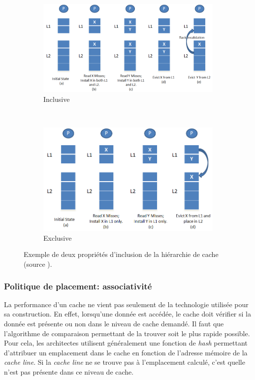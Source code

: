 \begin{figure}
    \centering
    \begin{subfigure}[b]{0.45\linewidth}
        \includegraphics[width=\linewidth]{images/InclusivePolicy.png}
        \caption{Inclusive}
        \label{pic:InclusivePolicy}
    \end{subfigure}
    ~ %
    \begin{subfigure}[b]{0.45\linewidth}
        \includegraphics[width=0.85\linewidth]{images/ExclusivePolicy.png}
        \caption{Exclusive}
        \label{pic:ExclusivePolicy}
    \end{subfigure}
    \caption{Exemple de deux propriétés d'inclusion de la hiérarchie de cache (source \cite{wikipedia_2019}). }\label{fig:cacheinclusionpolicy}
\end{figure}




\subsubsection{Politique de placement: associativité}
La performance d'un cache ne vient pas seulement de la technologie utilisée pour sa construction. En effet, lorsqu'une donnée est accédée, le cache doit vérifier si la donnée est présente ou non dans le niveau de cache demandé. Il faut que l'algorithme de comparaison permettant de la trouver soit le plus rapide possible. Pour cela, les architectes utilisent généralement une fonction de \textit{hash} permettant d'attribuer un emplacement dans le cache en fonction de l'adresse mémoire de la \textit{cache line}. Si la \textit{cache line} ne se trouve pas à l'emplacement calculé, c'est quelle n'est pas présente dans ce niveau de cache.


